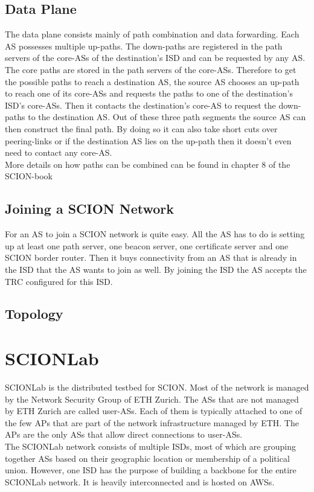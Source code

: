 \subsection{Data Plane}
The data plane consists mainly of path combination and data forwarding. Each \acs{AS} possesses multiple up-paths. The down-paths are registered in the path servers of the core-\acsp{AS} of the destination's \acs{ISD} and can be requested by any \acs{AS}. The core paths are stored in the path servers of the core-\acsp{AS}. Therefore to get the possible paths to reach a destination \acs{AS}, the source \acs{AS} chooses an up-path to reach one of its core-\acsp{AS} and requests the paths to one of the destination's \acs{ISD}'s core-\acsp{AS}. Then it contacts the destination's core-\acs{AS} to request the down-paths to the destination \acs{AS}. Out of these three path segments the source \acs{AS} can then construct the final path. By doing so it can also take short cuts over peering-links or if the destination \acs{AS} lies on the up-path then it doesn't even need to contact any core-\acs{AS}.
\\
More details on how paths can be combined can be found in chapter 8 of the \acs{SCION}-book \cite{perrig2017scion}

\subsection{Joining a SCION Network}
For an \acs{AS} to join a \acs{SCION} network is quite easy. All the \acs{AS} has to do is setting up at least one path server, one beacon server, one certificate server and one \acs{SCION} border router. Then it buys connectivity from an AS that is already in the \acs{ISD} that the \acs{AS} wants to join as well. By joining the \acs{ISD} the \acs{AS} accepts the \acs{TRC} configured for this \acs{ISD}.

\subsection{Topology}

\section{SCIONLab}
\acs{SCIONLab} is the distributed testbed for \acs{SCION}. Most of the network is managed by the Network Security Group of \acs{ETH} Zurich. The \acsp{AS} that are not managed by \acs{ETH} Zurich are called user-\acsp{AS}. Each of them is typically attached to one of the few \aclp{AP} that are part of the network infrastructure managed by \acs{ETH}. The \acsp{AP} are the only \acsp{AS} that allow direct connections to user-\acsp{AS}.
\\
The \acs{SCIONLab} network consists of multiple \acsp{ISD}, most of which are grouping together \acsp{AS} based on their geographic location or membership of a political union. However, one \acs{ISD} has the purpose of building a backbone for the entire \acs{SCIONLab} network. It is heavily interconnected and is hosted on \aclp{AWS}.

